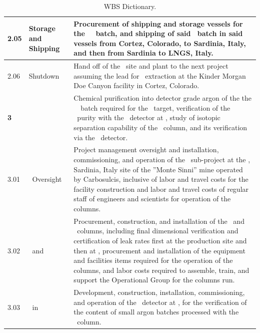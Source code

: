 \begin{table}[t]
{\begin{tabular}{@{}p{1.2cm}@{}@{}p{6.7cm}@{}@{}p{12.5cm}@{} }
\hline
\multirow{1}{*}{2.05} 					&Storage and Shipping					&Procurement of shipping and storage vessels for the \UraniaTotalDSkProduction\ \UAr\ batch, and shipping of said \UAr\ batch in said vessels from Cortez, Colorado, to Sardinia, Italy, and then from Sardinia to LNGS, Italy.\\
\hline
\multirow{1}{*}{2.06} 					&Shutdown								&Hand off of the \Urania\ site and plant to the next project assuming the lead for \UAr\ extraction at the Kinder Morgan Doe Canyon facility in Cortez, Colorado.\\
\hline\hline
\multirow{1}{*}{\bf 3} 					&{\bf \Aria}							&Chemical purification into detector grade argon of the the \UraniaTotalDSkProduction\ \UAr\ batch required for the \DSk\ target, verification of the \UAr\ purity with the \DArT\ detector at \LSC, study of isotopic separation capability of the \SeruciOne\ column, and its verification via the \DArT\ detector.\\
\hline
\multirow{1}{*}{3.01} 					&\Aria\ Oversight						&Project management oversight and installation, commissioning, and operation of the \Aria\ sub-project at the \Seruci, Sardinia, Italy site of the ''Monte Sinni'' mine operated by Carbosulcis, inclusive of labor and travel costs for the facility construction and labor and travel costs of regular staff of engineers and scientists for operation of the columns.\\
\hline
\multirow{1}{*}{3.02} 					&\SeruciZero\ and \SeruciOne\			&Procurement, construction, and installation of the \SeruciZero\ and \SeruciOne\ columns, including final dimensional verification and certification of leak rates first at the production site and then at \CERN, procurement and installation of the equipment and facilities items required for the operation of the columns, and labor costs required to assemble, train, and support the Operational Group for the columns run.\\
\hline
\multirow{1}{*}{3.03} 					&\DArT\ in \ArDM\						&Development, construction, installation, commissioning, and operation of the \DArT\ detector at \LSC, for the verification of the \ce{^39Ar} content of small argon batches processed with the \SeruciOne\ column.\\
\hline
\end{tabular}}
\caption[WBS Dictionary]{WBS Dictionary.}
\label{tab:WBSTable}
\end{table}


